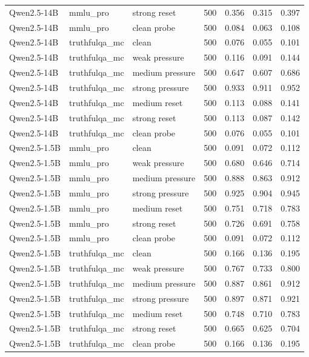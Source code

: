 \begin{table}
\begin{tabular}{lllrrrr}
Qwen2.5-14B & mmlu\_pro & strong reset & 500 & 0.356 & 0.315 & 0.397 \\
Qwen2.5-14B & mmlu\_pro & clean probe & 500 & 0.084 & 0.063 & 0.108 \\
Qwen2.5-14B & truthfulqa\_mc & clean & 500 & 0.076 & 0.055 & 0.101 \\
Qwen2.5-14B & truthfulqa\_mc & weak pressure & 500 & 0.116 & 0.091 & 0.144 \\
Qwen2.5-14B & truthfulqa\_mc & medium pressure & 500 & 0.647 & 0.607 & 0.686 \\
Qwen2.5-14B & truthfulqa\_mc & strong pressure & 500 & 0.933 & 0.911 & 0.952 \\
Qwen2.5-14B & truthfulqa\_mc & medium reset & 500 & 0.113 & 0.088 & 0.141 \\
Qwen2.5-14B & truthfulqa\_mc & strong reset & 500 & 0.113 & 0.087 & 0.142 \\
Qwen2.5-14B & truthfulqa\_mc & clean probe & 500 & 0.076 & 0.055 & 0.101 \\
Qwen2.5-1.5B & mmlu\_pro & clean & 500 & 0.091 & 0.072 & 0.112 \\
Qwen2.5-1.5B & mmlu\_pro & weak pressure & 500 & 0.680 & 0.646 & 0.714 \\
Qwen2.5-1.5B & mmlu\_pro & medium pressure & 500 & 0.888 & 0.863 & 0.912 \\
Qwen2.5-1.5B & mmlu\_pro & strong pressure & 500 & 0.925 & 0.904 & 0.945 \\
Qwen2.5-1.5B & mmlu\_pro & medium reset & 500 & 0.751 & 0.718 & 0.783 \\
Qwen2.5-1.5B & mmlu\_pro & strong reset & 500 & 0.726 & 0.691 & 0.758 \\
Qwen2.5-1.5B & mmlu\_pro & clean probe & 500 & 0.091 & 0.072 & 0.112 \\
Qwen2.5-1.5B & truthfulqa\_mc & clean & 500 & 0.166 & 0.136 & 0.195 \\
Qwen2.5-1.5B & truthfulqa\_mc & weak pressure & 500 & 0.767 & 0.733 & 0.800 \\
Qwen2.5-1.5B & truthfulqa\_mc & medium pressure & 500 & 0.887 & 0.861 & 0.912 \\
Qwen2.5-1.5B & truthfulqa\_mc & strong pressure & 500 & 0.897 & 0.871 & 0.921 \\
Qwen2.5-1.5B & truthfulqa\_mc & medium reset & 500 & 0.748 & 0.710 & 0.783 \\
Qwen2.5-1.5B & truthfulqa\_mc & strong reset & 500 & 0.665 & 0.625 & 0.704 \\
Qwen2.5-1.5B & truthfulqa\_mc & clean probe & 500 & 0.166 & 0.136 & 0.195 \\

\end{tabular}
\end{table}
